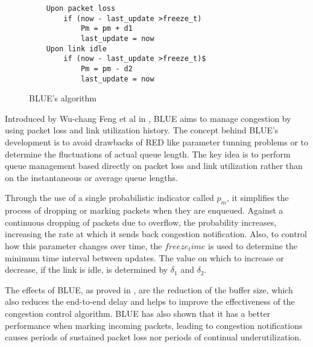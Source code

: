 \begin{wrapfigure}{r}{0.5\textwidth}
    \centering
	\begin{verbatim}
	Upon packet loss
	    if (now - last_update >freeze_t)
	        Pm = pm + d1
	        last_update = now
	Upon link idle
	    if (now - last_update >freeze_t)$
	        Pm = pm - d2
	        last_update = now
  	\end{verbatim}
    \caption{BLUE's algorithm}
    \label{fig:BLUEAlg}
\end{wrapfigure}

Introduced by Wu-chang Feng et al in \cite{FengBLUEAQM}, BLUE aims to manage
congestion by using packet loss and link utilization history. The concept
behind BLUE's development is to avoid drawbacks of RED like parameter tunning
problems or to determine the fluctuations of actual queue length. The key idea
is to perform queue management based directly on packet loss and link
utilization rather than on the instantaneous or average queue lengths.

Through the use of a single probabilistic indicator called $p_m$, it
simplifies the process of dropping or marking packets when they are enqueued.
Against a continuous dropping of packets due to overflow, the probability
increases, increasing the rate at which it sends back congestion notification.
Also, to control how this parameter changes over time, the
$freeze_time$ is used to determine the minimum time interval between
updates.  The value on which to increase or decrease, if the link is idle, is
determined by $\delta_1$ and $\delta_2$.

The effects of BLUE, as proved in \cite{FengBLUEAQM}, are the reduction of the
buffer size, which also reduces the end-to-end delay and helps to improve the
effectiveness of the congestion control algorithm. BLUE has also shown that it
has a better performance when marking incoming packets, leading to congestion
notifications causes periods of sustained packet loss nor periods of continual
underutilization.
